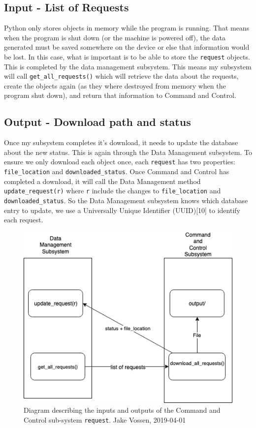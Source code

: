 \documentclass{article}
\begin{document}
\subsection{Input - List of Requests}

Python only stores objects in memory while the program is
running. That means when the program is shut down (or the machine is
powered off), the data generated must be saved somewhere on the
device or else that information would be lost. In this case, what is
important is to be able to store the \texttt{request} objects. This is
completed by the data management subsystem. This means my subsystem
will call \texttt{get\_all\_requests()} which will retrieve the data
about the requests, create the objects again (as they where destroyed
from memory when the program shut down), and return that information
to Command and Control.

\subsection{Output - Download path and status}

Once my subsystem completes it's download, it needs to update the
database about the new status. This is again through the Data
Management subsystem. To ensure we only download each object once, each
\texttt{request} has two properties: \texttt{file\_location} and
\texttt{downloaded\_status}. Once Command and Control has completed a
download, it will call the Data Management method
\texttt{update\_request(r)} where \texttt{r} include the changes to
\texttt{file\_location} and \texttt{downloaded\_status}. So the
Data Management subsystem knows which database entry to update, we use
a Universally Unique Identifier (UUID)[10] to identify each
request.

\begin{figure}[h]
  \centering
  \includegraphics[scale=.5]{input-output.png}
  \caption{\begingroup \fontsize{10pt}{12pt}\selectfont Diagram
    describing the inputs and outputs of the Command and Control sub-system
    \texttt{request}. Jake Vossen, 2019-04-01 \endgroup}
\end{figure}
\end{document}
